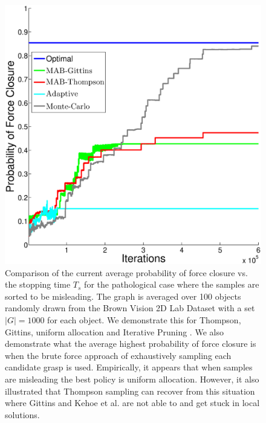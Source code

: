 \documentclass[10pt, conference]{ieeeconf}      %
\begin{document}
\begin{figure}[t!]
\centering
\includegraphics[scale=0.25]{matlab_figures/worst_case.eps}
\caption{ \footnotesize Comparison of the current average probability of force closure vs. the stopping time $T_s$ for the pathological case where the samples are sorted to be misleading. The graph is averaged over 100 objects randomly drawn from the Brown Vision 2D Lab Dataset \cite{brown} with a set $|G|=1000$ for each object.  We demonstrate this for Thompson, Gittins, uniform allocation and Iterative Pruning \cite{kehoe2012estimating}. We also demonstrate what the average highest probability of force closure is when the brute force approach of exhaustively sampling each candidate grasp is used. Empirically, it appears that when samples are misleading the best policy is uniform allocation. However, it also illustrated that Thompson sampling can recover from this situation where Gittins and Kehoe et al.  are not able to and get stuck in local solutions. }
\vspace*{-10pt}
\label{fig:worst_case}
\end{figure}
\end{document}
